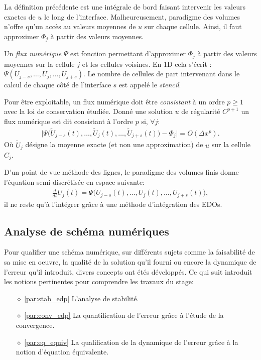     La définition précédente est une intégrale de bord faisant intervenir les valeurs exactes de $u$ le long de l'interface.
    Malheureusement, paradigme des volumes n'offre qu'un accès au valeurs moyennes de $u$ sur chaque cellule.
    Ainsi, il faut approximer $\Phi_j$ à partir des valeurs moyennes.
    \begin{definition}
        Un \textit{flux numérique} $\Psi$ est fonction permettant d’approximer $\Phi_j$ à partir des valeurs moyennes sur la cellule $j$ et les cellules voisines.
        En 1D cela s'écrit : $\Psi(U_{j-s} , \ldots , U_j ,\ldots , U_{j+s})$. Le nombre de cellules de part intervenant dans le calcul de chaque côté de l'interface $s$ est appelé le \textit{stencil}.
    \end{definition}

    \begin{definition}
        Pour être exploitable, un flux numérique doit être \textit{consistant} à un ordre $p\geq 1$ avec la loi de conservation étudiée.
        Donné une solution $u$ de régularité $C^{p+1}$ un flux numérique est dit consistant à l'ordre $p$ si, $\forall j$:
        \begin{align}
            \vert \Psi \bigl( \tilde U_{j-s}(t) , \ldots ,\tilde  U_j(t), \ldots ,  \tilde U_{j+s}(t)\bigr) -  \Phi_j \vert = O(\Delta x^p).
        \end{align}
        Où $\tilde U_j$ désigne la moyenne exacte (et non une approximation) de $u$ sur la cellule $C_j$.
    \end{definition}
    D'un point de vue méthode des lignes, le paradigme des volumes finis donne l'équation semi-discrétisée en espace suivante:
    \begin{align}
        \frac{d}{dt}{U_j(t)} = \Psi \bigl( U_{j-s}(t) , \ldots , U_j(t), \ldots ,  U_{j+s}(t)\bigr),
    \end{align}
    il ne reste qu'à l'intégrer grâce à une méthode d'intégration des EDOs.


\subsection{Analyse de schéma numériques}
    Pour qualifier une schéma numérique, sur différents sujets comme 
    la faisabilité de sa mise en oeuvre, la qualité de la solution qu'il fourni ou encore la dynamique de l'erreur qu'il introduit, 
    divers concepts ont étés développés. Ce qui suit introduit les notions pertinentes pour comprendre les travaux du stage: 
    \begin{itemize}
        \item[$\diamond$] \ref{par:stab_edp} L'analyse de stabilité.
        \item[$\diamond$] \ref{par:conv_edp} La quantification de l'erreur grâce à l'étude de la convergence.
        \item[$\diamond$] \ref{par:eq_equiv} La qualification de la dynamique de l'erreur grâce à la notion d'équation équivalente.
    \end{itemize}

